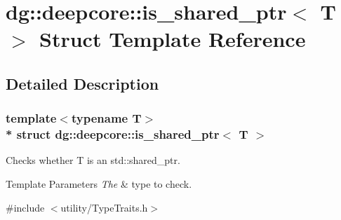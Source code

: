 \hypertarget{structdg_1_1deepcore_1_1is__shared__ptr}{}\section{dg\+:\+:deepcore\+:\+:is\+\_\+shared\+\_\+ptr$<$ T $>$ Struct Template Reference}
\label{structdg_1_1deepcore_1_1is__shared__ptr}


\subsection{Detailed Description}
\subsubsection*{template$<$typename T$>$\\*
struct dg\+::deepcore\+::is\+\_\+shared\+\_\+ptr$<$ T $>$}

Checks whether T is an {\ttfamily std\+::shared\+\_\+ptr}. 


\begin{DoxyTemplParams}{Template Parameters}
{\em The} & type to check. \\
\hline
\end{DoxyTemplParams}


{\ttfamily \#include $<$utility/\+Type\+Traits.\+h$>$}

